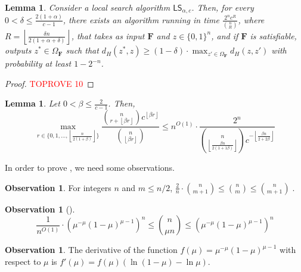 \documentclass[11pt, letterpaper]{article}
\newtheorem{lemma}[theorem]{Lemma}
\theoremstyle{definition}
\newtheorem{observation}[theorem]{Observation}
\newcommand{\f}{\mathbf{F}}
\newcommand{\Om}{\Omega_{\f}}
\newcommand{\LS}{\textsf{LS}}
\newcommand{\floor}[1]{{\left\lfloor{#1}\right\rfloor}}
\begin{document}
\begin{lemma} \label{lem:anchor:sch}
     Consider a local search algorithm $\LS_{\alpha, c}$. Then, for every $0 < \delta \leq \frac{2(1+\alpha)}{c-1}$, there exists an algorithm  running in time $\frac{2^n c^{R}}{\binom{n}{R} }$, where $R=\floor{\frac{\delta n}{2(1+\alpha+\delta)}}$, that takes as input $\f$ and $z \in \{0,1\}^n$, and if $\f$ is satisfiable, outputs $z^* \in \Om$ such that $d_H(z^*, z) \geq \left(1-\delta\right) \cdot \max_{z' \in \Om} d_H(z,z')$ with probability at least $1-2^{-n}$. 
\end{lemma}
\begin{proof}\textcolor{red}{TOPROVE 10}\end{proof} 
\begin{lemma} \label{lem:derivative}
    Let $0 < \beta \leq \frac{2}{c-1}$. Then,
    \[ \max_{r \in \{0,1,\dots, \floor{\frac{n}{2(1+\beta)}}\}} \frac{ \binom{n}{r+\floor{\beta r}} c^{\floor{\beta r}}}{    \binom{n}{\floor{\beta r}}} \leq n^{O(1)} \cdot  \frac{2^n}{\binom{n}{\floor{ \frac{\beta n}{2(1+1 \beta)}}} c^{-\floor{\frac{\beta n}{2+2 \beta}}}}\]
\end{lemma}

In order to prove , we need some observations.

\begin{observation} \label{obs:binomone}
    For integers $n$ and $m \leq n/2$, $\frac{2}{n} \cdot \binom{n}{m+1} \leq \binom{n}{m} \leq \binom{n}{m+1} \; .$
\end{observation}

\begin{observation}[\cite{macwilliams1977theory}] \label{obs:binomapprox}
\begin{equation*}
   \frac{1}{n^{O(1)}} \cdot \left(\mu^{-\mu} (1-\mu)^{\mu-1} \right)^n \leq \binom{n}{\mu n} \leq \left(\mu^{-\mu}  (1-\mu)^{\mu-1} \right)^n
\end{equation*}
\end{observation}

\begin{observation} \label{obs:binomderivative}
    The derivative of the function $f(\mu)=\mu^{-\mu} (1-\mu)^{\mu-1} $ with respect to $\mu$ is $f'(\mu)=f(\mu) \left( \ln{(1-\mu)} - \ln{\mu} \right)$.
\end{observation}
\end{document}
